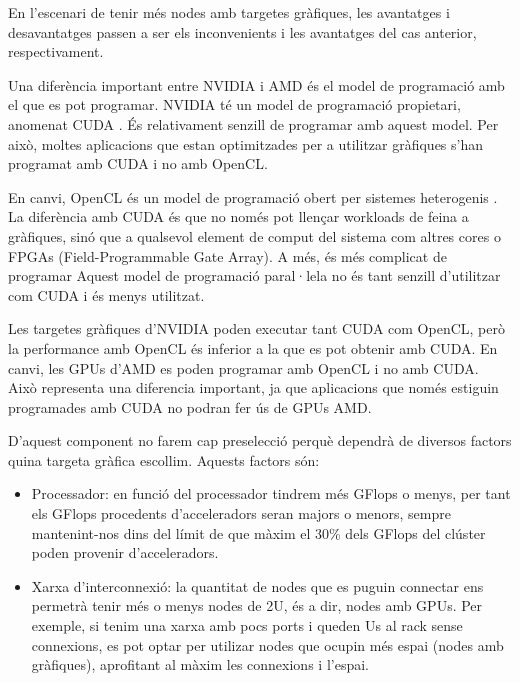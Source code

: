 En l'escenari de tenir més nodes amb targetes gràfiques, les avantatges i desavantatges passen a ser els inconvenients i les avantatges del cas anterior, respectivament.

Una diferència important entre NVIDIA i AMD és el model de programació amb el que es pot programar. 
NVIDIA té un model de programació propietari, anomenat CUDA \cite{gpu_cuda}. És relativament senzill de programar amb aquest model. Per això, moltes aplicacions que estan optimitzades per a utilitzar gràfiques s'han programat amb CUDA i no amb OpenCL.

En canvi, OpenCL és un model de programació obert per sistemes heterogenis \cite{gpu_opencl}. La diferència amb CUDA és que no només pot llençar workloads de feina a gràfiques, sinó que a qualsevol element de comput del sistema com altres cores o FPGAs (Field-Programmable Gate Array). A més, és més complicat de programar
Aquest model de programació paral·lela no és tant senzill d'utilitzar com CUDA i és menys utilitzat.

Les targetes gràfiques d'NVIDIA poden executar tant CUDA com OpenCL, però la performance amb OpenCL és inferior a la que es pot obtenir amb CUDA. En canvi, les GPUs d'AMD es poden programar amb OpenCL i no amb CUDA. 
Això representa una diferencia important, ja que aplicacions que només estiguin programades amb CUDA no podran fer ús de GPUs AMD.

D'aquest component no farem cap preselecció perquè dependrà de diversos factors quina targeta gràfica escollim. Aquests factors són: 
\begin{itemize}
    \item Processador: en funció del processador tindrem més GFlops o menys, per tant els GFlops procedents d'acceleradors seran majors o menors, sempre mantenint-nos dins del límit de que màxim el 30\% dels GFlops del clúster poden provenir d'acceleradors.
    \item Xarxa d'interconnexió: la quantitat de nodes que es puguin connectar ens permetrà tenir més o menys nodes de 2U, és a dir, nodes amb GPUs. Per exemple, si tenim una xarxa amb pocs ports i queden Us al rack sense connexions, es pot optar per utilizar nodes que ocupin més espai (nodes amb gràfiques), aprofitant al màxim les connexions i l'espai.
\end{itemize}


